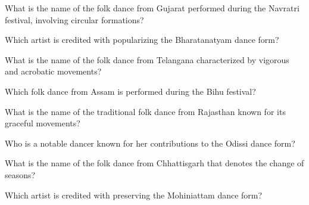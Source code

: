 \documentclass[12pt,a4paper]{book}
\begin{document}
\begin{enhancedmcq}[Question 6]{What is the name of the folk dance from Gujarat performed during the Navratri festival, involving circular formations?}
\end{enhancedmcq}

\begin{enhancedmcq}[Question 7]{Which artist is credited with popularizing the Bharatanatyam dance form?}
\end{enhancedmcq}

\begin{enhancedmcq}[Question 8]{What is the name of the folk dance from Telangana characterized by vigorous and acrobatic movements?}
\end{enhancedmcq}

\begin{enhancedmcq}[Question 9]{Which folk dance from Assam is performed during the Bihu festival?}
\end{enhancedmcq}

\begin{enhancedmcq}[Question 10]{What is the name of the traditional folk dance from Rajasthan known for its graceful movements?}
\end{enhancedmcq}

\begin{enhancedmcq}[Question 11]{Who is a notable dancer known for her contributions to the Odissi dance form?}
\end{enhancedmcq}

\begin{enhancedmcq}[Question 12]{What is the name of the folk dance from Chhattisgarh that denotes the change of seasons?}
\end{enhancedmcq}

\begin{enhancedmcq}[Question 13]{Which artist is credited with preserving the Mohiniattam dance form?}
\end{enhancedmcq}
\end{document}

